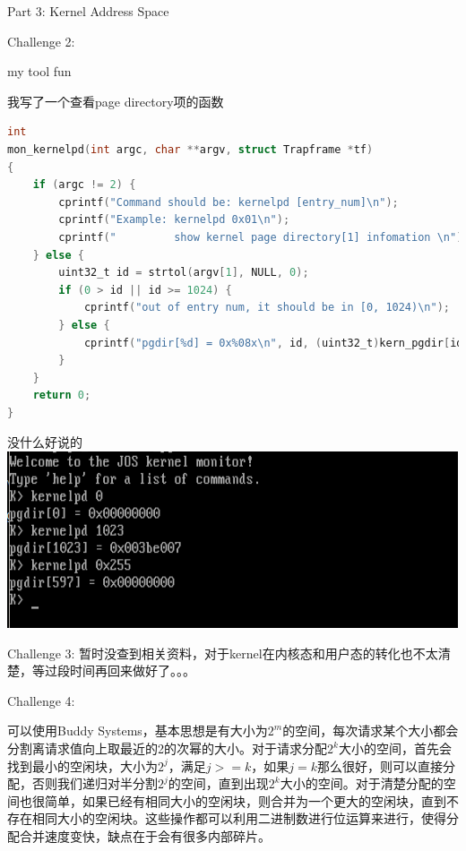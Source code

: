 \documentclass[GBK,winfonts,a4paper,10pt]{ctexart}
\begin{document}
\begin{section}{Part 3: Kernel Address Space}
\begin{subsection}{Challenge 2:}
\begin{subsubsection}{ my tool fun }
\par
我写了一个查看page directory项的函数
\begin{lstlisting}[language=C]
int 
mon_kernelpd(int argc, char **argv, struct Trapframe *tf)
{
    if (argc != 2) {
        cprintf("Command should be: kernelpd [entry_num]\n");
        cprintf("Example: kernelpd 0x01\n");
        cprintf("         show kernel page directory[1] infomation \n");
    } else {
        uint32_t id = strtol(argv[1], NULL, 0);
        if (0 > id || id >= 1024) {
            cprintf("out of entry num, it should be in [0, 1024)\n");
        } else {
            cprintf("pgdir[%d] = 0x%08x\n", id, (uint32_t)kern_pgdir[id]);
        }
    }
    return 0;
}
\end{lstlisting}
\par
没什么好说的
\includegraphics[scale=0.5]{kernelpd.png}
\end{subsubsection}

\end{subsection}

\begin{subsection}{Challenge 3:}
暂时没查到相关资料，对于kernel在内核态和用户态的转化也不太清楚，等过段时间再回来做好了。。。
\end{subsection}

\begin{subsection}{Challenge 4:}
\par
可以使用Buddy Systems，基本思想是有大小为$2^m$的空间，每次请求某个大小都会分割离请求值向上取最近的2的次幂的大小。对于请求分配$2^k$大小的空间，首先会找到最小的空闲块，大小为$2^j$，满足$j>=k$，如果$j=k$那么很好，则可以直接分配，否则我们递归对半分割$2^j$的空间，直到出现$2^k$大小的空间。对于清楚分配的空间也很简单，如果已经有相同大小的空闲块，则合并为一个更大的空闲块，直到不存在相同大小的空闲块。这些操作都可以利用二进制数进行位运算来进行，使得分配合并速度变快，缺点在于会有很多内部碎片。
\end{subsection}

\end{section}
\end{document}
